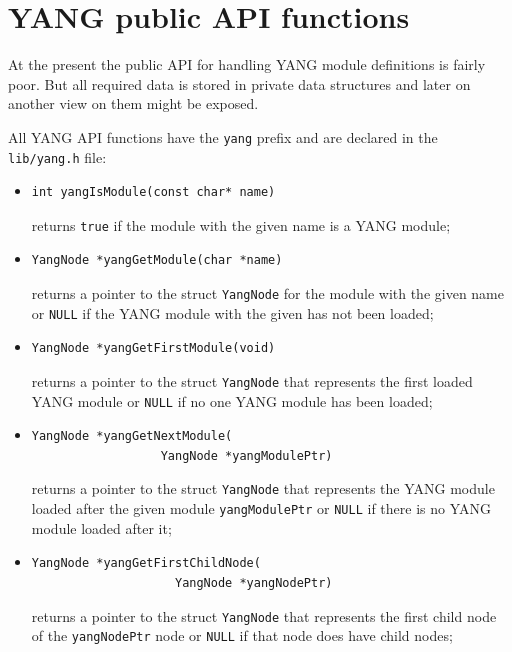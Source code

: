 \documentclass[conference]{IEEEtran}
\begin{document}
\section{YANG public API functions}
At the present the public API for handling YANG module definitions is fairly poor. But all required data is stored in private data structures and later on another view on them might be exposed.

All YANG API functions have the \texttt{yang} prefix and are declared in the \texttt{lib/yang.h} file:
\begin{itemize}
\item 
\small
\begin{verbatim}
int yangIsModule(const char* name)
\end{verbatim}
\normalsize
 returns \texttt{true} if the module with the given name is a YANG module;

\item 
\small
\begin{verbatim}
YangNode *yangGetModule(char *name)
\end{verbatim}
\normalsize
returns a pointer to the struct \texttt{YangNode} for the module with the given name or \texttt{NULL} if the YANG module with the given has not been loaded;

\item 
\small
\begin{verbatim}
YangNode *yangGetFirstModule(void)
\end{verbatim}
\normalsize
returns a pointer to the struct \texttt{YangNode} that represents the first loaded YANG module or \texttt{NULL} if no one YANG module has been loaded;

\item 
\small
\begin{verbatim}
YangNode *yangGetNextModule(
                  YangNode *yangModulePtr)
\end{verbatim}
\normalsize
returns a pointer to the struct \texttt{YangNode} that represents the YANG module loaded after the given module \texttt{yangModulePtr} or \texttt{NULL} if there is no YANG module loaded after it;

\item 
\small
\begin{verbatim}
YangNode *yangGetFirstChildNode(
                    YangNode *yangNodePtr)
\end{verbatim}
\normalsize
returns a pointer to the struct \texttt{YangNode} that represents the first child node of the \texttt{yangNodePtr} node or \texttt{NULL} if that node does have child nodes;


\end{itemize}
\end{document}
